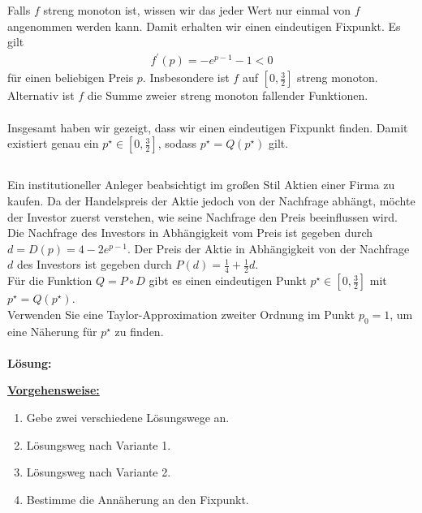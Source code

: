Falls $ f $ streng monoton ist, wissen wir das jeder Wert nur einmal von $ f $ angenommen werden kann.
Damit erhalten wir einen eindeutigen Fixpunkt. Es gilt
\begin{align*}
	f^\prime(p) = -e^{p-1} - 1 < 0
\end{align*}
für einen beliebigen Preis $ p $. Insbesondere ist $ f $ auf $ \left[0,\frac{3}{2}\right] $ streng monoton.\\
Alternativ ist $ f $ die Summe zweier streng monoton fallender Funktionen.\\
\\
Insgesamt haben wir gezeigt, dass wir einen eindeutigen Fixpunkt finden.
Damit existiert genau ein $ p^\star  \in \left[0,\frac{3}{2}\right]  $, sodass $ p^\star = Q(p^\star ) $ gilt.

\newpage
\subsection*{}
Ein institutioneller Anleger beabsichtigt im großen Stil Aktien einer Firma zu kaufen.
Da der Handelspreis der Aktie jedoch von der Nachfrage abhängt, möchte der Investor zuerst verstehen, wie seine Nachfrage den Preis beeinflussen wird.
Die Nachfrage des Investors in Abhängigkeit vom Preis ist gegeben durch $ d = D(p) =4 - 2 e^{p-1}$.
Der Preis der Aktie in Abhängigkeit von der Nachfrage $ d $ des Investors ist gegeben durch $ P(d) = \frac{1}{4} + \frac{1}{2} d $.\\
Für die Funktion $ Q = P \circ D $ gibt es einen eindeutigen Punkt $ p^\star \in \left[0,\frac{3}{2}\right]  $ mit $ p^\star = Q(p^\star) $.\\
Verwenden Sie eine Taylor-Approximation zweiter Ordnung im Punkt $ p_0 = 1 $, um eine Näherung für $ p^\star  $ zu finden.
\\ \\
\textbf{Lösung:}
\begin{mdframed}
\underline{\textbf{Vorgehensweise:}}
\begin{enumerate}
\item Gebe zwei verschiedene Lösungswege an.
\item Lösungsweg nach Variante 1.
\item Lösungsweg nach Variante 2.
\item Bestimme die Annäherung an den Fixpunkt.
\end{enumerate}
\end{mdframed}


